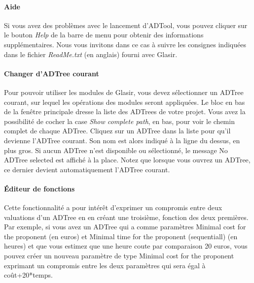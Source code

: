 \paragraph{Aide} Si vous avez des problèmes avec le lancement d'ADTool, vous pouvez cliquer sur le bouton \emph{Help} de la barre de menu pour obtenir des informations supplémentaires. Nous vous invitons dans ce cas à suivre les consignes indiquées dans le fichier \emph{ReadMe.txt} (en anglais) fourni avec Glasir.

\paragraph{Changer d'ADTree courant} Pour pouvoir utiliser les modules de Glasir, vous devez sélectionner un ADTree courant, sur lequel les opérations des modules seront appliquées. Le bloc en bas de la fenêtre principale dresse la liste des ADTrees de votre projet.  Vous avez la possibilité de cocher la case \emph{Show complete path}, en bas, pour voir le chemin complet de chaque ADTree. Cliquez sur un ADTree dans la liste pour qu'il devienne l'ADTree courant. Son nom est alors indiqué à la ligne du dessus, en plus gros. Si aucun ADTree n'est disponible ou sélectionné, le message \og No ADTree selected \fg{} est affiché à la place. Notez que lorsque vous ouvrez un ADTree, ce dernier devient automatiquement l'ADTree courant.

\paragraph{Éditeur de fonctions}Cette fonctionnalité a pour intérêt d'exprimer un compromis entre deux valuations d'un ADTree en en créant une troisième, fonction des deux premières. Par exemple, si vous avez un ADTree qui a comme paramètres \og Minimal cost for the proponent \fg (en euros) et \og Minimal time for the proponent (sequentiall) \fg (en heures) et que vous estimez que une heure \og coute \fg par comparaison 20 euros, vous pouvez créer un nouveau paramètre de type \og Minimal cost for the proponent \fg exprimant un compromis entre les deux paramètres qui sera égal à coût+20*temps.

